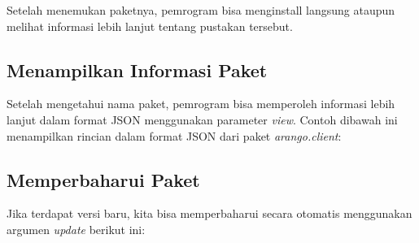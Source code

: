 \lstset{language=bash,caption=Perintah menghapus paket di npm}


Setelah menemukan paketnya, pemrogram bisa menginstall langsung ataupun melihat informasi lebih lanjut tentang pustakan tersebut.

\subsection{Menampilkan Informasi Paket}

Setelah mengetahui nama paket, pemrogram bisa memperoleh informasi lebih lanjut dalam format JSON menggunakan parameter \textit{view}. Contoh dibawah ini menampilkan rincian dalam format JSON dari paket \textit{arango.client}:

\lstset{language=bash,caption=Menampilkan rincian suatu paket dalam format JSON}


\subsection{Memperbaharui Paket}

Jika terdapat versi baru, kita bisa memperbaharui secara otomatis menggunakan argumen \textit{update} berikut ini:

\lstset{language=bash,caption=Memperbaharui paket}

